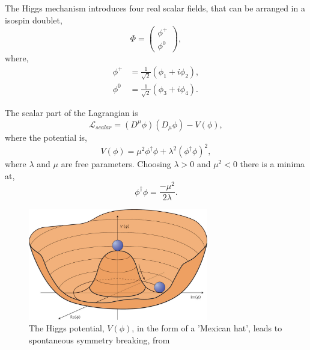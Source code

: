 The Higgs mechanism introduces four real scalar fields, that can be arranged in a
isospin doublet,
\begin{equation}
\Phi = \left( \begin{matrix} \phi^{+} \\ \phi^{0} \end{matrix} \right),
\end{equation}
where,
\begin{align*}
\phi^{+} &=\frac{1}{\sqrt{2}} (\phi_{1} + i \phi_{2}),\\
\phi^{0} &=\frac{1}{\sqrt{2}} (\phi_{3} + i \phi_{4}).
\end{align*}

The scalar part of the Lagrangian is
\begin{equation}
\mathcal{L}_{scalar} = 
\left(D^{\mu}\phi\right) \left(D_{\mu}\phi\right) - V(\phi),
\end{equation}
where the potential is,
\begin{equation}
V(\phi) = 
\mu^{2}\phi^{\dagger}\phi + 
\lambda^{2} \left( \phi^{\dagger} \phi \right)^{2},
\end{equation}
where $\lambda$ and $\mu$ are free parameters. Choosing  $\lambda>0$ and
$\mu^{2}<0$ there is a minima at,
\begin{equation}
\phi^{\dagger} \phi = \frac{- \mu^{2}}{2 \lambda}.
\end{equation}

\begin{figure}[htb]
  \centering
  \includegraphics[width=0.7\textwidth]{nphys1874-f1.jpg}
  \caption{ The Higgs potential, $V(\phi)$, in the form of a 'Mexican hat',
leads to spontaneous symmetry breaking, from \cite{}}
  \label{fig:higgspot}
\end{figure}

